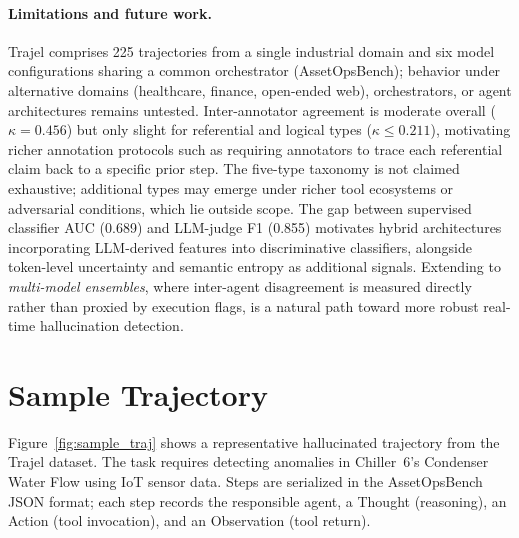 \documentclass{article}
\begin{document}
\paragraph{Limitations and future work.}
Trajel comprises 225 trajectories from a single industrial domain and six model configurations sharing a common orchestrator (AssetOpsBench); behavior under alternative domains (healthcare, finance, open-ended web), orchestrators, or agent architectures remains untested. Inter-annotator agreement is moderate overall ($\kappa = 0.456$) but only slight for referential and logical types ($\kappa \leq 0.211$), motivating richer annotation protocols such as requiring annotators to trace each referential claim back to a specific prior step. The five-type taxonomy is not claimed exhaustive; additional types may emerge under richer tool ecosystems or adversarial conditions, which lie outside scope. The gap between supervised classifier AUC (0.689) and LLM-judge F1 (0.855) motivates hybrid architectures incorporating LLM-derived features into discriminative classifiers, alongside token-level uncertainty and semantic entropy as additional signals. Extending to \emph{multi-model ensembles}, where inter-agent disagreement is measured directly rather than proxied by execution flags, is a natural path toward more robust real-time hallucination detection.

\newpage




\appendix

\section{Sample Trajectory}
\label{app:sample_trajectory}

Figure~\ref{fig:sample_traj} shows a representative hallucinated trajectory from the Trajel dataset. The task requires detecting anomalies in Chiller~6's Condenser Water Flow using IoT sensor data. Steps are serialized in the AssetOpsBench JSON format; each step records the responsible agent, a Thought (reasoning), an Action (tool invocation), and an Observation (tool return).
\end{document}
